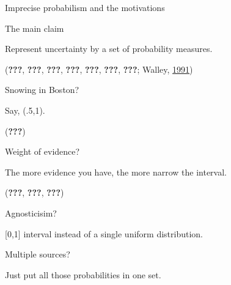 \documentclass[10pt,ignorenonframetext,x11names, dvipsnames, bibspacing,natbib]{beamer}
\begin{document}
\begin{frame}{Imprecise probabilism and the motivations}

\begin{block}{The main claim}

\justify Represent uncertainty by a set of probability measures.

\vspace{1mm} \scriptsize 

({\textbf{???}}, {\textbf{???}}, {\textbf{???}}, {\textbf{???}},
{\textbf{???}}, {\textbf{???}}, {\textbf{???}}; Walley,
\protect\hyperlink{ref-walley1991statistical}{1991})

\pause

\end{block}

\begin{block}{Snowing in Boston?}

\vspace{-1mm}

Say, (.5,1).

\vspace{1mm} \scriptsize 

({\textbf{???}})

\pause

\end{block}

\begin{block}{Weight of evidence?}

\vspace{-1mm}

The more evidence you have, the more narrow the interval.

\vspace{1mm} \scriptsize 

({\textbf{???}}, {\textbf{???}}, {\textbf{???}})

\pause

\end{block}

\begin{block}{Agnosticisim?}

\vspace{-1mm}

{[}0,1{]} interval instead of a single uniform distribution.

\pause

\end{block}

\begin{block}{Multiple sources?}

\vspace{-1mm}

Just put all those probabilities in one set.

\end{block}

\end{frame}
\end{document}
